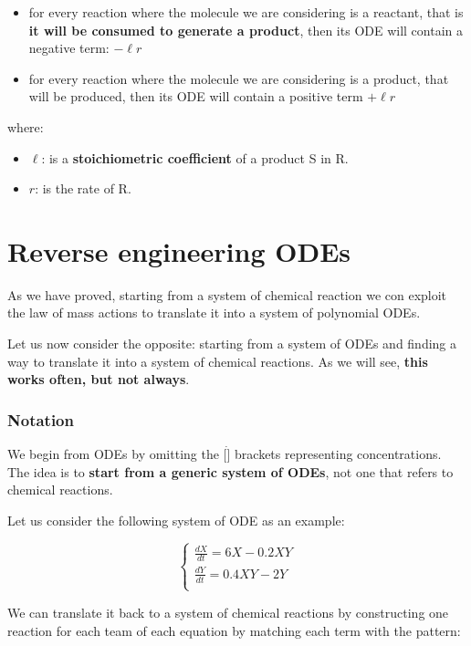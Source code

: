 \begin{itemize}
    \item for every reaction where the molecule we are considering is a reactant, that is \textbf{it will be consumed to generate a product}, then its ODE will contain a negative term: $- \ell r$

    \item for every reaction where the molecule we are considering is a product, that will be produced, then its ODE will contain a positive term $+ \ell r$
    
\end{itemize}

where:
\begin{itemize}
    \item $\ell$: is a \textbf{stoichiometric coefficient} of a product S in R.
    \item $r$: is the rate of R.
\end{itemize}


\section{Reverse engineering ODEs}
As we have proved, starting from a system of chemical reaction we con exploit the law of mass actions to translate it into a system of polynomial ODEs. \par
Let us now consider the opposite: starting from a system of ODEs and finding a way to translate it into a system of chemical reactions. As we will see, \textbf{this works often, but not always}.

\subsubsection{Notation}
We begin from ODEs by omitting the $[\dot]$ brackets representing concentrations. The idea is to \textbf{start from a generic system of ODEs}, not one that refers to chemical reactions.

Let us consider the following system of ODE as an example:

\[
\begin{cases}
        \frac{dX}{dt} = 6 X - 0.2 X Y \\
        \frac{dY}{dt} = 0.4 X Y - 2 Y\\
\end{cases}
\]

We can translate it back to a system of chemical reactions by constructing one reaction for each team of each equation by matching each term with the pattern:

